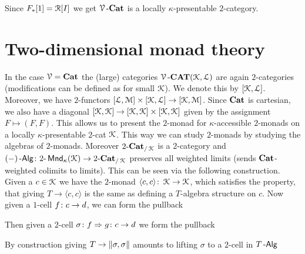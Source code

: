 \documentclass[a4paper,11pt,oneside,openany]{scrbook}
\begin{document}
\begin{rmk}
   Since $F_{\ast}[1] = \Rf[I]$ we get $\V\text{-}\Cat$ is a locally $\kappa$-presentable $2$-category. 
\end{rmk}

\section{Two-dimensional monad theory}

In the case $\V=\Cat$ the (large) categories $\V\text{-}\CAT(\K,\Lf)$ are again $2$-categories (modifications can be defined as for small $\K$). We denote 
this by $[\K,\Lf]$. Moreover, we have $2$-functors $[\Lf,\M] \times [\K,\Lf] \to [\K,\M]$. Since $\Cat$ is cartesian, we also have a diagonal 
$[\K,\K] \to [\K,\K] \times [\K,\K]$ given by the assignment $F \mapsto (F,F)$. This allows us to present the $2$-monad for $\kappa$-accessible $2$-monads on
a locally $\kappa$-presentable $2$-cat $\K$. This way we can study $2$-monads by studying the algebras of $2$-monads. Moreover $2\text{-}\Cat_{/\K}$ is 
a $2$-category and $(-)\Alg \from 2\text{-}\Mnd_{\kappa}(\K) \to 2\text{-}\Cat_{/\K}$ preserves all weighted limits (sends $\Cat$-weighted colimits to limits). 
This can be seen via the following construction. Given a $c \in \K$ we have the $2$-monad $\langle c,c \rangle \from \K \to \K$, which satisfies the property, that 
giving $T \to \langle c,c \rangle$ is the same as defining a $T$-algebra structure on $c$. Now given a $1$-cell $f \from c \to d$, we can form the pullback
   \begin{center}
   \end{center}
Then given a $2$-cell $\sigma \from f \Rightarrow g \from c \to d$ we form the pullback 
   \begin{center}
   \end{center}
By construction giving $T \to \Arrowvert \sigma,\sigma \Arrowvert$ amounts to lifting $\sigma$ to a $2$-cell in $T\Alg$
   \begin{center}
   \end{center}
   
\end{document}
